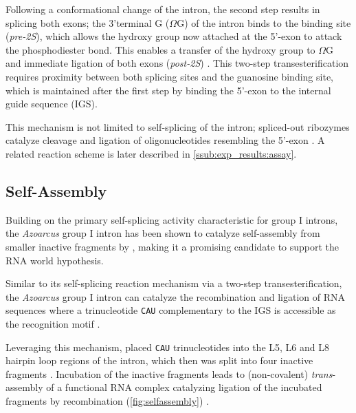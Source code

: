 \documentclass[../../master.tex]{subfiles}
\begin{document}
Following a conformational change of the intron, the second step results in splicing both exons; the 3'terminal G ($\Omega\mathrm{G}$) of the intron binds to the binding site (\emph{pre-2S}), which allows the hydroxy group now attached at the 5'-exon to attack the phosphodiester bond.
This enables a transfer of the hydroxy group to $\Omega\mathrm{G}$ and immediate ligation of both exons (\emph{post-2S}) \parencite{adams_crystal_2004-1}. 
This two-step transesterification requires proximity between both splicing sites and the guanosine binding site, which is maintained after the first step by binding the 5'-exon to the internal guide sequence (IGS).

This mechanism is not limited to self-splicing of the intron; spliced-out ribozymes catalyze cleavage and ligation of oligonucleotides resembling the 5'-exon \parencite{kuo_characterization_1999, gleitsman_kinetic_2014}.
A related reaction scheme is later described in \autoref{ssub:exp_results:assay}.

\subsection{Self-Assembly}
\label{sub:theory:azoarcus_selfassembly}

Building on the primary self-splicing activity characteristic for group I introns, the \textit{Azoarcus} group I intron has been shown to catalyze self-assembly from smaller inactive fragments by \citeauthor{hayden_self-assembly_2006} \parencite{hayden_self-assembly_2006}, making it a promising candidate to support the RNA world hypothesis.

Similar to its self-splicing reaction mechanism via a two-step transesterification, the \textit{Azoarcus} group I intron can catalyze the recombination and ligation of RNA sequences where a trinucleotide \texttt{CAU} complementary to the IGS is accessible as the recognition motif \parencite{hayden_rna-directed_2005}.

Leveraging this mechanism, \citeauthor{hayden_self-assembly_2006} placed \texttt{CAU} trinucleotides into the L5, L6 and L8 hairpin loop regions of the intron, which then was split into four inactive fragments \parencite{hayden_self-assembly_2006}.
Incubation of the inactive fragments leads to (non-covalent) \textit{trans}-assembly of a functional RNA complex catalyzing ligation of the incubated fragments by recombination (\autoref{fig:selfassembly}) \parencite{hayden_self-assembly_2006, hayden_systems_2008}.
\end{document}
